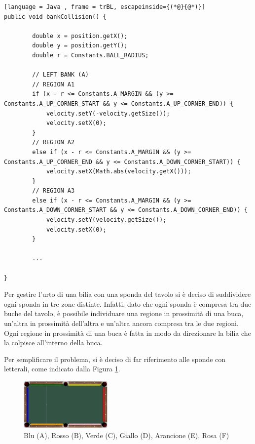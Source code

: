 \documentclass[12pt,a4paper]{report}
\begin{document}
\begin{lstlisting}[language = Java , frame = trBL, escapeinside={(*@}{@*)}]
public void bankCollision() {

        double x = position.getX();
        double y = position.getY();
        double r = Constants.BALL_RADIUS;

        // LEFT BANK (A)
        // REGION A1
        if (x - r <= Constants.A_MARGIN && (y >= Constants.A_UP_CORNER_START && y <= Constants.A_UP_CORNER_END)) {
            velocity.setY(-velocity.getSize());
            velocity.setX(0);
        }
        // REGION A2
        else if (x - r <= Constants.A_MARGIN && (y >= Constants.A_UP_CORNER_END && y <= Constants.A_DOWN_CORNER_START)) {
            velocity.setX(Math.abs(velocity.getX()));
        }
        // REGION A3
        else if (x - r <= Constants.A_MARGIN && (y >= Constants.A_DOWN_CORNER_START && y <= Constants.A_DOWN_CORNER_END)) {
            velocity.setY(velocity.getSize());
            velocity.setX(0);
        }
        
        ...
        
}
\end{lstlisting}

\pagebreak

Per gestire l'urto di una bilia con una sponda del tavolo si è deciso di suddividere ogni sponda in tre zone distinte.
Infatti, dato che ogni sponda è compresa tra due buche del tavolo, è possibile individuare una regione in prossimità di una buca, un'altra in prossimità dell'altra e un'altra ancora compresa tra le due regioni.
Ogni regione in prossimità di una buca è fatta in modo da direzionare la bilia che la colpisce all'interno della buca.

Per semplificare il problema, si è deciso di far riferimento alle sponde con letterali, come indicato dalla Figura \ref{fig:Banks}.

\begin{figure}[h]
    \centering
    \includegraphics[width=0.4\textwidth]{Banks.png}
    \caption{Blu (A), Rosso (B), Verde (C), Giallo (D), Arancione (E), Rosa (F)}
    \label{fig:Banks}
\end{figure}
\end{document}
